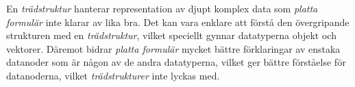 En \textit{trädstruktur} hanterar representation av djupt komplex data som \textit{platta formulär} inte klarar av lika bra. Det kan vara enklare att förstå den övergripande strukturen med en \textit{trädstruktur}, vilket speciellt gynnar datatyperna objekt och vektorer. Däremot bidrar \textit{platta formulär} mycket bättre förklaringar av enstaka datanoder som är någon av de andra datatyperna, vilket ger bättre förståelse för datanoderna, vilket \textit{trädstrukturer} inte lyckas med.